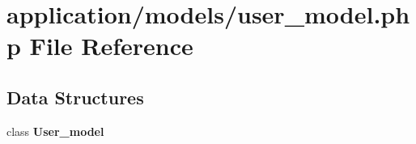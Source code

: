 \section{application/models/user\-\_\-model.php File Reference}
\label{user__model_8php}
\subsection*{Data Structures}
\begin{DoxyCompactItemize}
\item 
class {\bf User\-\_\-model}
\end{DoxyCompactItemize}
